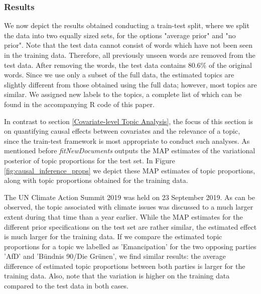 \subsubsection{Results}
\label{Results}

We now depict the results obtained conducting a train-test split, where we split the data into two equally sized sets, for the options "average prior" and "no prior". Note that the test data cannot consist of words which have not been seen in the training data. Therefore, all previously unseen words are removed from the test data. After removing the words, the test data contains 80.6\% of the original words. Since we use only a subset of the full data, the estimated topics are slightly different from those obtained using the full data; however, most topics are similar. We assigned new labels to the topics, a complete list of which can be found in the accompanying R code of this paper.

In contrast to section \ref{Covariate-level Topic Analysis}, the focus of this section is on quantifying causal effects between covariates and the relevance of a topic, since the train-test framework is most appropriate to conduct such analyses. As mentioned before \textit{fitNewDocuments} outputs the MAP estimates of the variational posterior of topic proportions for the test set. In Figure \ref{fig:causal_inference_props} we depict these MAP estimates of topic proportions, along with topic proportions obtained for the training data.

The UN Climate Action Summit 2019 was held on 23 September 2019. As can be observed, the topic associated with climate issues was discussed to a much larger extent during that time than a year earlier. While the MAP estimates for the different prior specifications on the test set are rather similar, the estimated effect is much larger for the training data. If we compare the estimated topic proportions for a topic we labelled as 'Emancipation' for the two opposing parties 'AfD' and 'B{\"u}ndnis 90/Die Gr{\"u}nen', we find similar results: the average difference of estimated topic proportions between both parties is larger for the training data. Also, note that the variation is higher on the training data compared to the test data in both cases.


